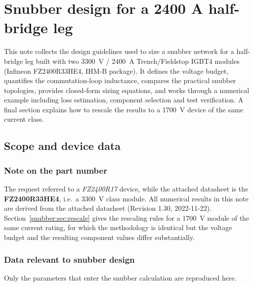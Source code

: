 \chapter{Snubber design for a 2400 A half-bridge leg}
\label{ch:snubber}
\begin{chapabstract}
This note collects the design guidelines used to size a snubber network for a
half-bridge leg built with two \SI{3300}{\volt} / \SI{2400}{\ampere}
Trench/Fieldstop IGBT4 modules (Infineon FZ2400R33HE4, IHM-B package).
It defines the voltage budget, quantifies the commutation-loop inductance,
compares the practical snubber topologies, provides closed-form sizing
equations, and works through a numerical example including loss estimation,
component selection and test verification. A final section explains how to
rescale the results to a \SI{1700}{\volt} device of the same current class.
\end{chapabstract}

\section{Scope and device data}

\subsection{Note on the part number}

The request referred to a \emph{FZ2400R17} device, while the attached datasheet
is the \textbf{FZ2400R33HE4}, i.e.\ a \SI{3300}{\volt} class module.
All numerical results in this note are derived from the attached datasheet
(Revision 1.30, 2022-11-22). Section~\ref{snubber:sec:rescale} gives the rescaling
rules for a \SI{1700}{\volt} module of the same current rating, for which the
methodology is identical but the voltage budget and the resulting component
values differ substantially.

\subsection{Data relevant to snubber design}

Only the parameters that enter the snubber calculation are reproduced here.

